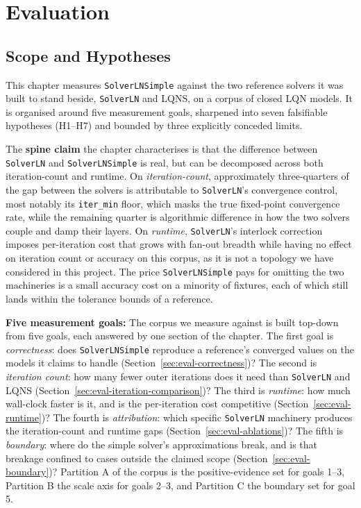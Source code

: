 \chapter{Evaluation}
\label{ch:eval}








\section{Scope and Hypotheses}
\label{sec:eval-hypotheses}

This chapter measures \texttt{SolverLNSimple} against the two reference solvers it was built to stand beside, \texttt{SolverLN} and LQNS, on a corpus of closed LQN models. It is organised around five measurement goals, sharpened into seven falsifiable hypotheses (H1--H7) and bounded by three explicitly conceded limits.

The \textbf{spine claim} the chapter characterises is that the difference between \texttt{SolverLN} and \texttt{SolverLNSimple} is real, but can be decomposed across both iteration-count and runtime. On \emph{iteration-count}, approximately three-quarters of the gap between the solvers is attributable to \texttt{SolverLN}'s convergence control, most notably its \texttt{iter\_min} floor, which masks the true fixed-point convergence rate, while the remaining quarter is algorithmic difference in how the two solvers couple and damp their layers. On \emph{runtime}, \texttt{SolverLN}'s interlock correction imposes per-iteration cost that grows with fan-out breadth while having no effect on iteration count or accuracy on this corpus, as it is not a topology we have considered in this project. The price \texttt{SolverLNSimple} pays for omitting the two machineries is a small accuracy cost on a minority of fixtures, each of which still lands within the tolerance bounds of a reference.

\textbf{Five measurement goals:} The corpus we measure against is built top-down from five goals, each answered by one section of the chapter. The first goal is \emph{correctness}: does \texttt{SolverLNSimple} reproduce a reference's converged values on the models it claims to handle (Section~\ref{sec:eval-correctness})? The second is \emph{iteration count}: how many fewer outer iterations does it need than \texttt{SolverLN} and LQNS (Section~\ref{sec:eval-iteration-comparison})? The third is \emph{runtime}: how much wall-clock faster is it, and is the per-iteration cost competitive (Section~\ref{sec:eval-runtime})? The fourth is \emph{attribution}: which specific \texttt{SolverLN} machinery produces the iteration-count and runtime gaps (Section~\ref{sec:eval-ablations})? The fifth is \emph{boundary}: where do the simple solver's approximations break, and is that breakage confined to cases outside the claimed scope (Section~\ref{sec:eval-boundary})? Partition A of the corpus is the positive-evidence set for goals 1--3, Partition B the scale axis for goals 2--3, and Partition C the boundary set for goal 5.

